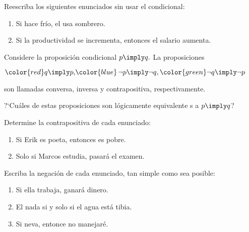 \begin{problema}
	\label{lip:sol:4.6}
	Reescriba los siguientes enunciados sin usar el condicional:
	\begin{enumerate}
		\item Si hace frío, el usa sombrero. 
		\item Si la productividad se incrementa, entonces el salario aumenta.
	\end{enumerate}
	
\end{problema}




\begin{problema}
	\label{lip:sol:4.7}
	Considere la proposición condicional $p \imply q.$ La proposiciones 
	\begin{center}
		${\color{red}q \imply p,} {\color{blue}\, \neg p \imply \neg q,} \, {\color{green}\neg q \imply \neg p}$
	\end{center}
	son llamadas {\color{red} conversa,} {\color{blue}inversa} y {\color{green} contrapositiva}, respectivamente.
	
	
	?`Cuáles de estas proposiciones son lógicamente equivalente s a $p\imply q$?
\end{problema}




\begin{problema}
	Determine la contrapositiva de cada enunciado:
	\begin{enumerate}
		\item Si Erik es poeta, entonces es pobre. 
		\item Solo si Marcos estudia, pasará el examen. 
	\end{enumerate}
	
\end{problema}




\begin{problema}
	Escriba la negación de cada enunciado, tan simple como sea posible:
	\begin{enumerate}
		\item Si ella trabaja, ganará dinero. 
		\item El nada si y solo si el agua está tibia. 
		\item Si neva, entonce no manejar\'e.
	\end{enumerate}
	
\end{problema}



